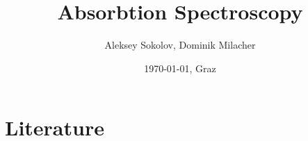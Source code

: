 \documentclass{article}
\date{\today{}, Graz}
\author{Aleksey Sokolov, Dominik Milacher}
\title{Absorbtion Spectroscopy}
\begin{document}
\tableofcontents
\newpage

%









\section{Literature}
\printbibliography
\end{document}
